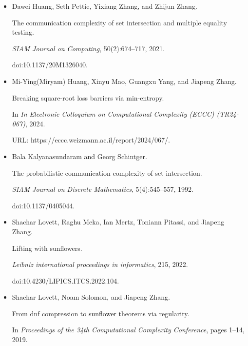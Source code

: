 \begin{itemize}
\item[] 
[32]

Dawei Huang, Seth Pettie, Yixiang Zhang, and Zhijun Zhang.


The communication complexity of set intersection and multiple
equality testing.


\emph{SIAM Journal on Computing}, 50(2):674–717, 2021.


doi:10.1137/20M1326040.





\item[] 
[33]

Mi-Ying(Miryam) Huang, Xinyu Mao, Guangxu Yang, and Jiapeng Zhang.


Breaking square-root loss barriers via min-entropy.


In \emph{In Electronic Colloquium on Computational Complexity (ECCC)
(TR24-067)}, 2024.


URL: https://eccc.weizmann.ac.il/report/2024/067/.





\item[] 
[34]

Bala Kalyanasundaram and Georg Schintger.


The probabilistic communication complexity of set intersection.


\emph{SIAM Journal on Discrete Mathematics}, 5(4):545–557, 1992.


doi:10.1137/0405044.





\item[] 
[35]

Shachar Lovett, Raghu Meka, Ian Mertz, Toniann Pitassi, and Jiapeng Zhang.


Lifting with sunflowers.


\emph{Leibniz international proceedings in informatics}, 215, 2022.


doi:10.4230/LIPICS.ITCS.2022.104.





\item[] 
[36]

Shachar Lovett, Noam Solomon, and Jiapeng Zhang.


From dnf compression to sunflower theorems via regularity.


In \emph{Proceedings of the 34th Computational Complexity Conference},
pages 1–14, 2019.



\end{itemize}
